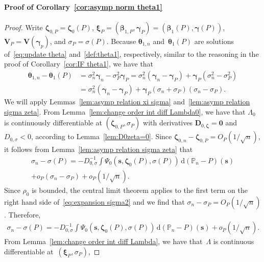 \documentclass{article}
\numberwithin{equation}{section}
\theoremstyle{plain}
\newcommand{\dd}{\mathrm{d}}
\newcommand{\bbeta}{\bm\beta}
\newcommand{\btheta}{\bm\theta}
\newcommand{\bxi}{\bm\xi}
\newcommand{\bgamma}{\bm\gamma}
\newcommand{\bzeta}{\bm\zeta}
\newcommand{\bV}{\mathbf{V}}
\newcommand{\bD}{\mathbf{D}}
\begin{document}
\paragraph*{Proof of Corollary~\ref{cor:asymp norm theta1}}
\begin{proof}
Write $\bzeta_{0,P}=\bzeta_0(P)$, $\bxi_P=(\bbeta_{1,P},\bgamma_P)=(\bbeta_1(P),\bgamma(P))$,
$\bV_P=\bV(\bgamma_p)$, and $\sigma_P=\sigma(P)$.
Because $\btheta_{1,n}$ and~$\btheta_1(P)$ are solutions of~\eqref{eq:update theta} and~\eqref{def:theta1}, respectively,
similar to the reasoning in the proof of Corollary~\ref{cor:IF theta1},
we have that
\begin{equation}
\label{eq:decomp theta1}
\begin{split}
\btheta_{1,n}-\btheta_1(P)
&=
\sigma_n^2\bgamma_n-\sigma_P^2\bgamma_P
=
\sigma_n^2(\bgamma_n-\bgamma_P)
+
\bgamma_P(\sigma_n^2-\sigma_P^2)\\
&=
\sigma_n^2(\bgamma_n-\bgamma_P)
+
\bgamma_P(\sigma_n+\sigma_P)(\sigma_n-\sigma_P).
\end{split}
\end{equation}
We will apply Lemmas~\ref{lem:asymp relation xi sigma} and~\ref{lem:asymp relation sigma zeta}.
From Lemma~\ref{lem:change order int diff Lambda0},
we have that $\Lambda_0$ is continuously differentiable at $(\bzeta_{0,P},\sigma_P)$ with derivatives
$\bD_{0,\bzeta}=\mathbf{0}$ and
$D_{0,\sigma}<0$, according to Lemma~\ref{lem:D0zeta=0}.
Since $\bzeta_{0,n}-\bzeta_{0,P}=O_P(1/\sqrt{n})$, it follows from 
Lemma~\ref{lem:asymp relation sigma zeta} that
\[
\begin{split}
\sigma_n-\sigma(P)
=
-D_{0,\sigma}^{-1}
\int \Psi_0(\mathbf{s},\bzeta_0(P),\sigma(P))\,\dd (\mathbb{P}_n-P)(\mathbf{s})\\
+
o_P(\sigma_n-\sigma_P)
+
o_P(1/\sqrt{n}).
\end{split}
\]
Since $\rho_0$ is bounded, the central limit theorem applies 
to the first term on the right hand side of~\eqref{eq:expansion sigma2}
and we find that $\sigma_ n-\sigma_P=O_P(1/\sqrt{n})$.
Therefore,
\begin{equation}
\label{eq:expansion sigma2}
\begin{split}
\sigma_n-\sigma(P)
=
-D_{0,\sigma}^{-1}
\int \Psi_0(\mathbf{s},\bzeta_0(P),\sigma(P))\,\dd (\mathbb{P}_n-P)(\mathbf{s})
+
o_P(1/\sqrt{n}).
\end{split}
\end{equation}
From Lemma~\ref{lem:change order int diff Lambda},
we have that~$\Lambda$ is continuous differentiable at~$(\bxi_P,\sigma_P)$,

\end{proof}
\end{document}
